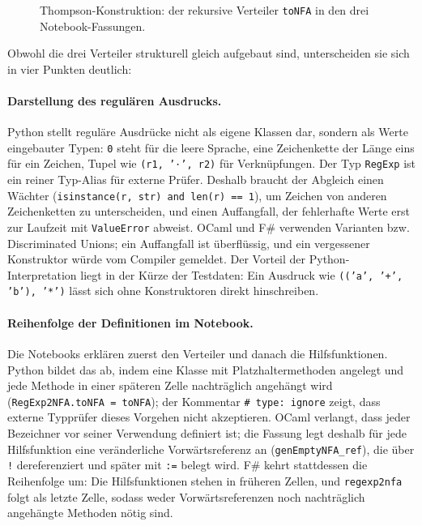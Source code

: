 \begin{figure}[p]



\caption{Thompson-Konstruktion: der rekursive Verteiler \texttt{toNFA} in den drei Notebook-Fassungen.}
\label{fig:thompson_dispatch}
\end{figure}

Obwohl die drei Verteiler strukturell gleich aufgebaut sind, unterscheiden sie sich in vier Punkten deutlich:

\paragraph{Darstellung des regulären Ausdrucks.}
Python stellt reguläre Ausdrücke nicht als eigene Klassen dar, sondern als Werte eingebauter Typen: \texttt{0} steht für die leere Sprache, eine Zeichenkette der Länge eins für ein Zeichen, Tupel wie \texttt{(r1, '⋅', r2)} für Verknüpfungen.
Der Typ \texttt{RegExp} ist ein reiner Typ-Alias für externe Prüfer.
Deshalb braucht der Abgleich einen Wächter (\texttt{isinstance(r, str) and len(r) == 1}), um Zeichen von anderen Zeichenketten zu unterscheiden, und einen Auffangfall, der fehlerhafte Werte erst zur Laufzeit mit \texttt{ValueError} abweist.
OCaml und F\# verwenden Varianten bzw. Discriminated Unions; ein Auffangfall ist überflüssig, und ein vergessener Konstruktor würde vom Compiler gemeldet.
Der Vorteil der Python-Interpretation liegt in der Kürze der Testdaten: Ein Ausdruck wie \texttt{(('a', '+', 'b'), '*')} lässt sich ohne Konstruktoren direkt hinschreiben.

\paragraph{Reihenfolge der Definitionen im Notebook.}
Die Notebooks erklären zuerst den Verteiler und danach die Hilfsfunktionen.
Python bildet das ab, indem eine Klasse mit Platzhaltermethoden angelegt und jede Methode in einer späteren Zelle nachträglich angehängt wird (\texttt{RegExp2NFA.toNFA = toNFA}); der Kommentar \texttt{\# type: ignore} zeigt, dass externe Typprüfer dieses Vorgehen nicht akzeptieren.
OCaml verlangt, dass jeder Bezeichner vor seiner Verwendung definiert ist; die Fassung legt deshalb für jede Hilfsfunktion eine veränderliche Vorwärtsreferenz an (\texttt{genEmptyNFA\_ref}), die über \texttt{!} dereferenziert und später mit \texttt{:=} belegt wird.
F\# kehrt stattdessen die Reihenfolge um: Die Hilfsfunktionen stehen in früheren Zellen, und \texttt{regexp2nfa} folgt als letzte Zelle, sodass weder Vorwärtsreferenzen noch nachträglich angehängte Methoden nötig sind.

